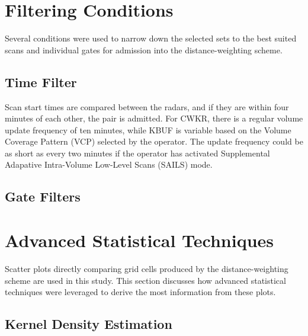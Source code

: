 \section{Filtering Conditions}
Several conditions were used to narrow down the selected sets to the best suited scans and individual gates for admission into the distance-weighting scheme.
\subsection{Time Filter}
Scan start times are compared between the radars, and if they are within four minutes of each other, the pair is admitted. For CWKR, there is a regular volume update frequency of ten minutes, while KBUF is variable based on the Volume Coverage Pattern (VCP) selected by the operator. The update frequency could be as short as every two minutes if the operator has activated Supplemental Adapative Intra-Volume Low-Level Scans (SAILS) mode.
\subsection{Gate Filters}

\section{Advanced Statistical Techniques}
Scatter plots directly comparing grid cells produced by the distance-weighting scheme are used in this study. This section discusses how advanced statistical techniques were leveraged to derive the most information from these plots.
\subsection{Kernel Density Estimation}

